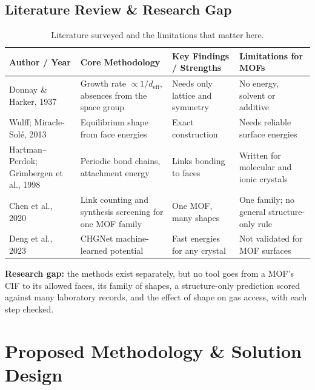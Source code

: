 \documentclass[11pt, a4paper]{article}
\begin{document}
\subsection{Literature Review \& Research Gap}
\begin{table}[H]
    \centering
    \footnotesize
    \renewcommand{\arraystretch}{1.2}
    \begin{tabular}{|p{2.8cm}|p{4.2cm}|p{4.2cm}|p{3.4cm}|}
        \hline
        \textbf{Author / Year} & \textbf{Core Methodology} & \textbf{Key Findings / Strengths} & \textbf{Limitations for MOFs} \\
        \hline
        Donnay \& Harker, 1937 \cite{donnay1937} & Growth rate $\propto 1/d_\text{eff}$, absences from the space group & Needs only lattice and symmetry & No energy, solvent or additive \\
        \hline
        Wulff; Miracle-Sol\'e, 2013 \cite{miracle2013} & Equilibrium shape from face energies & Exact construction & Needs reliable surface energies \\
        \hline
        Hartman--Perdok; Grimbergen et al., 1998 \cite{grimbergen1998} & Periodic bond chains, attachment energy & Links bonding to faces & Written for molecular and ionic crystals \\
        \hline
        Chen et al., 2020 \cite{chen2020} & Link counting and synthesis screening for one MOF family & One MOF, many shapes & One family; no general structure-only rule \\
        \hline
        Deng et al., 2023 \cite{deng2023} & CHGNet machine-learned potential & Fast energies for any crystal & Not validated for MOF surfaces \\
        \hline
    \end{tabular}
    \caption{Literature surveyed and the limitations that matter here.}
\end{table}
\noindent
\textbf{Research gap:} the methods exist separately, but no tool goes from a MOF's CIF to its allowed faces, its family of shapes, a structure-only prediction scored against many laboratory records, and the effect of shape on gas access, with each step checked.

\section{Proposed Methodology \& Solution Design}
\end{document}
